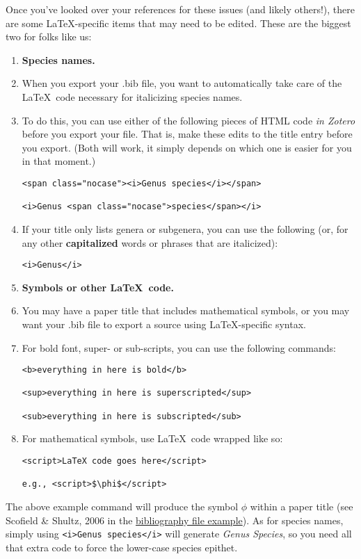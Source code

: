 \documentclass[11pt]{article}
\begin{document}
Once you've looked over your references for these issues (and likely others!), there are some \LaTeX-specific items that may need to be edited. These are the biggest two for folks like us:

\begin{enumerate}
\item[]{\textbf{Species names.}}
\item[]{When you export your .bib file, you want to automatically take care of the \LaTeX\ code necessary for italicizing species names.} 
\item{To do this, you can use either of the following pieces of HTML code \textit{in Zotero} before you export your file. That is, make these edits to the title entry before you export. (Both will work, it simply depends on which one is easier for you in that moment.)
\begin{verbatim}
<span class="nocase"><i>Genus species</i></span>

<i>Genus <span class="nocase">species</span></i>
\end{verbatim}
}
\item{If your title only lists genera or subgenera, you can use the following (or, for any other \textbf{capitalized} words or phrases that are italicized):
\begin{verbatim}
<i>Genus</i>
\end{verbatim}
}
\pagebreak
\item[]{\textbf{Symbols or other \LaTeX\ code.}}
\item[]{You may have a paper title that includes mathematical symbols, or you may want your .bib file to export a source using \LaTeX-specific syntax.}
\item{For bold font, super- or sub-scripts, you can use the following commands:
\begin{verbatim}
<b>everything in here is bold</b>

<sup>everything in here is superscripted</sup>

<sub>everything in here is subscripted</sub>
\end{verbatim}
}
\item{For mathematical symbols, use \LaTeX\ code wrapped like so:
\begin{verbatim}
<script>LaTeX code goes here</script>

e.g., <script>$\phi$</script>
\end{verbatim}
}
\end{enumerate}

The above example command will produce the symbol $\phi$ within a paper title (see Scofield \& Shultz, 2006 in the \href{https://github.com/ledelaney/BibTeXforBrownLab/blob/master/ExampleFiles/RefsOnlyBib/MyImportantBibliography.pdf}{bibliography file example}). As for species names, simply using \verb|<i>Genus species</i>| will generate \textit{Genus Species}, so you need all that extra code to force the  lower-case species epithet.
\end{document}
